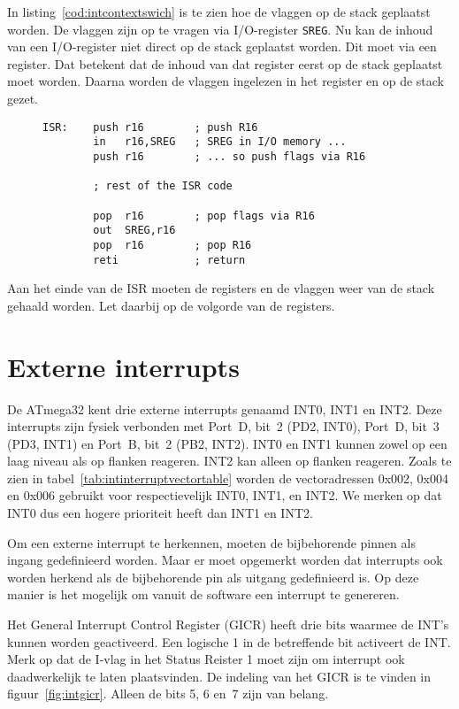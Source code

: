 In listing~\ref{cod:intcontextswich} is te zien hoe de vlaggen op de stack
geplaatst worden. De vlaggen zijn op te vragen via I/O-register
\lstinline|SREG|. Nu kan de inhoud van een I/O-register niet direct op de
stack geplaatst worden. Dit moet via een register. Dat betekent dat de inhoud
van dat register eerst op de stack geplaatst moet worden. Daarna worden de
vlaggen ingelezen in het register en op de stack gezet.

\begin{figure}[!ht]
\begin{lstlisting}[language=AVRassembler,caption=Opslaan van de registers en vlaggen.,label=cod:intcontextswich]
ISR:	push r16		; push R16
		in   r16,SREG	; SREG in I/O memory ...
		push r16		; ... so push flags via R16
		
		; rest of the ISR code

		pop  r16		; pop flags via R16
		out  SREG,r16
		pop  r16		; pop R16
		reti			; return
\end{lstlisting}
\end{figure}

Aan het einde van de ISR moeten de registers en de vlaggen weer van de stack
gehaald worden. Let daarbij op de volgorde van de registers.


\section{Externe interrupts}
De ATmega32 kent drie externe interrupts genaamd INT0, INT1 en INT2. Deze
interrupts zijn fysiek verbonden met Port~D, bit~2 (PD2, INT0), Port~D, bit~3
(PD3, INT1) en Port~B, bit~2 (PB2, INT2). INT0 en INT1 kunnen zowel op een
laag niveau als op flanken reageren. INT2 kan alleen op flanken reageren.
Zoals te
zien in tabel~\ref{tab:intinterruptvectortable} worden de vectoradressen
0x002, 0x004 en 0x006 gebruikt voor respectievelijk INT0, INT1, en INT2. We
merken op dat INT0 dus een hogere prioriteit heeft dan INT1 en INT2.

Om een externe interrupt te herkennen, moeten de bijbehorende pinnen als
ingang gedefinieerd worden. Maar er moet opgemerkt worden dat interrupts
ook worden herkend als de bijbehorende pin als uitgang gedefinieerd is. Op
deze manier is het mogelijk om vanuit de software een interrupt te genereren. 

Het General Interrupt Control Register (GICR) heeft drie bits waarmee de INT’s
kunnen worden geactiveerd. Een logische 1 in de betreffende bit activeert de
INT. Merk op dat de I-vlag in het Status Reister 1 moet zijn om interrupt ook
daadwerkelijk te laten plaatsvinden. De indeling van het GICR is te vinden in
figuur~\ref{fig:intgicr}. Alleen de bits 5, 6 en~7 zijn van belang. 

